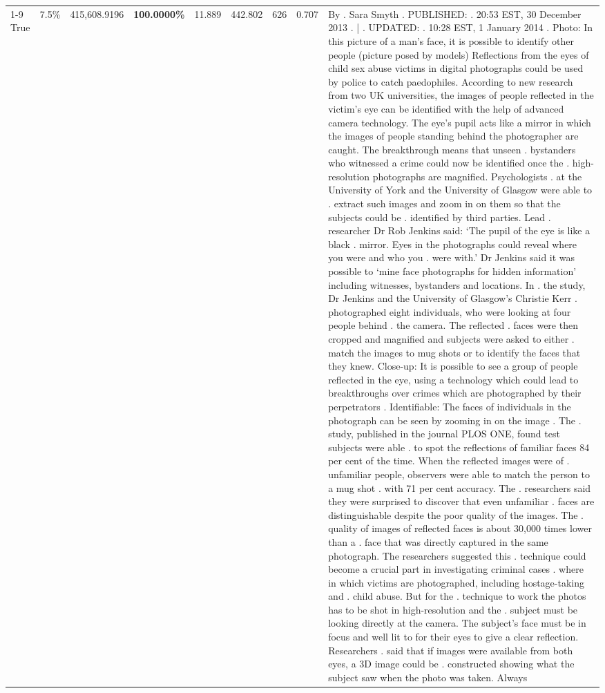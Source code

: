 \begin{table}[H]
\begin{tabular}{lllrlllll}
\cline{1-9}
True & 7.5\% & 415,608.9196 & \bfseries \color{red} 100.0000\% & 11.889 & 442.802 & 626 & 0.707 & By . Sara Smyth . PUBLISHED: . 20:53 EST, 30 December 2013 . | . UPDATED: . 10:28 EST, 1 January 2014 . Photo: In this picture of a man's face, it is possible to identify other people (picture posed by models) Reflections from the eyes of child sex abuse victims in digital photographs could be used by police to catch paedophiles. According to new research from two UK universities, the images of people reflected in the victim's eye can be identified with the help of advanced camera technology. The eye's pupil acts like a mirror in which the images of people standing behind the photographer are caught. The breakthrough means that unseen . bystanders who witnessed a crime could now be identified once the . high-resolution photographs are magnified. Psychologists . at the University of York and the University of Glasgow were able to . extract such images and zoom in on them so that the subjects could be . identified by third parties. Lead . researcher Dr Rob Jenkins said: ‘The pupil of the eye is like a black . mirror. Eyes in the photographs could reveal where you were and who you . were with.' Dr Jenkins said it was possible to ‘mine face photographs for hidden information' including witnesses, bystanders and locations. In . the study, Dr Jenkins and the University of Glasgow's Christie Kerr . photographed eight individuals, who were looking at four people behind . the camera. The reflected . faces were then cropped and magnified and subjects were asked to either . match the images to mug shots or to identify the faces that they knew. Close-up: It is possible to see a group of people reflected in the eye, using a technology which could lead to breakthroughs over crimes which are photographed by their perpetrators . Identifiable: The faces of individuals in the photograph can be seen by zooming in on the image . The . study, published in the journal PLOS ONE, found test subjects were able . to spot the reflections of familiar faces 84 per cent of the time. When the reflected images were of . unfamiliar people, observers were able to match the person to a mug shot . with 71 per cent accuracy. The . researchers said they were surprised to discover that even unfamiliar . faces are distinguishable despite the poor quality of the images. The . quality of images of reflected faces is about 30,000 times lower than a . face that was directly captured in the same photograph. The researchers suggested this . technique could become a crucial part in investigating criminal cases . where in which victims are photographed, including hostage-taking and . child abuse. But for the . technique to work the photos has to be shot in high-resolution and the . subject must be looking directly at the camera. The subject's face must be in focus and well lit to for their eyes to give a clear reflection. Researchers . said that if images were available from both eyes, a 3D image could be . constructed showing what the subject saw when the photo was taken. Always \\

\end{tabular}
\end{table}
